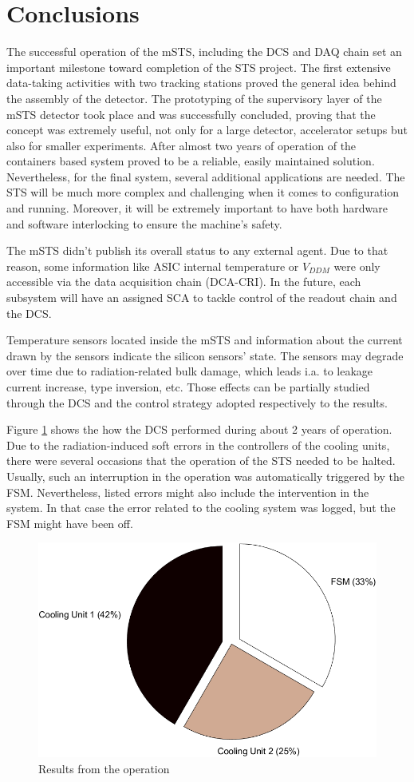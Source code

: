 \section{Conclusions}

The successful operation of the \gls{mSTS}, including the \gls{DCS} and \gls{DAQ} chain set an important milestone toward completion of the \gls{STS} project. The first extensive data-taking activities with two tracking stations proved the general idea behind the assembly of the detector. The prototyping of the supervisory layer of the \gls{mSTS} detector took place and was successfully concluded, proving that the concept was extremely useful, not only for a large detector, accelerator setups but also for smaller experiments. After almost two years of operation of the containers based system proved to be a reliable, easily maintained solution. Nevertheless, for the final system, several additional applications are needed. The \gls{STS} will be much more complex and challenging when it comes to configuration and running. Moreover, it will be extremely important to have both hardware and software interlocking to ensure the machine's safety.

The \gls{mSTS} didn't publish its overall status to any external agent. Due to that reason, some information like \gls{ASIC} internal temperature or $V_{DDM}$ were only accessible via the data acquisition chain (\gls{DCA}-\gls{CRI}). In the future, each subsystem will have an assigned \gls{SCA} to tackle control of the readout chain and the \gls{DCS}. 


Temperature sensors located inside the \gls{mSTS} and information about the current drawn by the sensors indicate the silicon sensors' state. The sensors may degrade over time due to radiation-related bulk damage,  which leads i.a. to leakage current increase, type inversion, etc. Those effects can be partially studied through the \gls{DCS} and the control strategy adopted respectively to the results.

Figure \ref{fig_dcs_results} shows the how the \gls{DCS} performed during about 2 years of operation. Due to the radiation-induced soft errors in the controllers of the cooling units, there were several occasions that the operation of the \gls{STS} needed to be halted. Usually, such an interruption in the operation was automatically triggered by the \gls{FSM}. Nevertheless, listed errors might also include the intervention in the system. In that case the error related to the cooling system was logged, but the FSM might have been off.
\begin{figure}[!h]
\centering
\includegraphics[width=0.55\columnwidth]{Chapter6/DCS/images/DCSpie.png}
\caption{Results from the operation}
\label{fig_dcs_results}
\end{figure}
